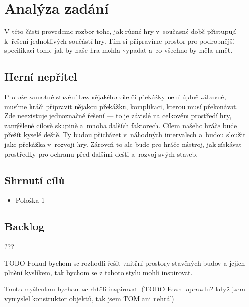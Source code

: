 
\chapter{Analýza zadání}
\label{chap:analyza}

V této části provedeme rozbor toho, jak různé hry v~současné době přistupují k~řešení jednotlivých součástí hry. Tím si připravíme prostor pro podrobnější specifikaci toho, jak by naše hra mohla vypadat a~co všechno by měla umět.









\section{Herní nepřítel}
Protože samotné stavění bez nějakého cíle či překážky není úplně zábavné, musíme hráči připravit nějakou překážku, komplikaci, kterou musí překonávat. Zde neexistuje jednoznačné řešení --- to je závislé na celkovém prostředí hry, zamýšlené cílově skupině a~mnoha dalších faktorech. Cílem našeho hráče bude přežít kyselé deště. Ty budou přicházet v~náhodných intervalech a~budou sloužit jako překážka v~rozvoji hry. Zároveň to ale bude pro hráče nástroj, jak získávat prostředky pro ochranu před dalšími dešti a~rozvoj svých staveb. 

\section{Shrnutí cílů}

\begin{itemize}
	\item Položka 1
\end{itemize}


\section{Backlog}

???






TODO Pokud bychom se rozhodli řešit vnitřní prostory stavěných budov a jejich plnění kyslíkem, tak bychom se z tohoto stylu mohli inspirovat.

Touto myšlenkou bychom se chtěli inspirovat.  (TODO Pozn. opravdu? když jsem vymyslel konstruktor objektů, tak jsem TOM ani nehrál)




